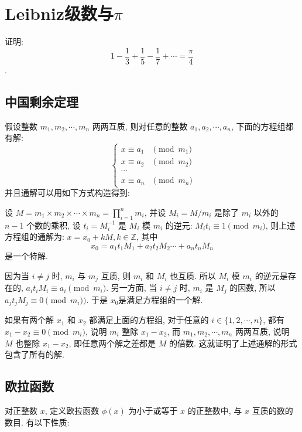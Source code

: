\newpage
\section{Leibniz级数与\texorpdfstring{$\pi$}{pi}}

证明: $$ 1 - \frac{1}{3} + \frac{1}{5} - \frac{1}{7} + \cdots = \frac{\pi}{4} $$.

\subsection{中国剩余定理}
假设整数 $ m_1, m_2, \cdots, m_n $ 两两互质, 则对任意的整数 $ a_1, a_2, \cdots, a_n $, 下面的方程组都有解: 
\begin{equation*}
\ \begin{cases}
x\equiv a_{1} & \pmod{m_1}\\
x\equiv a_{2} & \pmod{m_2}\\
\cdots  & \\
x\equiv a_{n} & \pmod{m_n}
\end{cases}
\end{equation*}
并且通解可以用如下方式构造得到: 

设 $ M = m_1\times m_2\times\cdots\times m_n = \prod_{i=1}^{n}{m_i} $, 并设 $ M_i = M / m_i $ 是除了 $ m_i $ 以外的 $ n - 1 $ 个数的乘积, 设 $ t_i = M_i^{-1} $ 是 $ M_i $ 模 $ m_i $ 的逆元: $ M_it_i \equiv 1 \pmod{m_i} $, 则上述方程组的通解为: $ x = x_0 + kM, k\in \mathbb{Z} $, 其中 $$ x_0 = a_1t_1M_1 + a_2t_2M_2\cdots + a_nt_nM_n $$ 是一个特解.

因为当 $ i \neq j $ 时, $ m_i $ 与 $ m_j $ 互质, 则 $ m_i $ 和 $ M_i $ 也互质. 所以 $ M_i $ 模 $ m_i $ 的逆元是存在的, $ a_it_iM_i \equiv a_i \pmod{m_i} $. 另一方面, 当 $ i \neq j $ 时, $ m_i $ 是 $ M_j $ 的因数, 所以 $ a_jt_jM_j \equiv 0 \pmod{m_i}) $. 于是 $ x_0 $是满足方程组的一个解. 

如果有两个解 $ x_1 $ 和 $ x_2 $ 都满足上面的方程组, 对于任意的 $ i\in\{1, 2, \cdots, n\} $, 都有 $ x_1 - x_2 \equiv 0 \pmod{m_i} $, 说明 $ m_i $ 整除 $ x_1 - x_2 $, 而 $ m_1, m_2, \cdots, m_n $ 两两互质, 说明 $ M $ 也整除 $ x_1 - x_2 $, 即任意两个解之差都是 $ M $ 的倍数. 这就证明了上述通解的形式包含了所有的解.

\subsection{欧拉函数}
对正整数 $ x $, 定义欧拉函数 $ \phi(x) $ 为小于或等于 $ x $ 的正整数中, 与 $ x $ 互质的数的数目. 
有以下性质:


